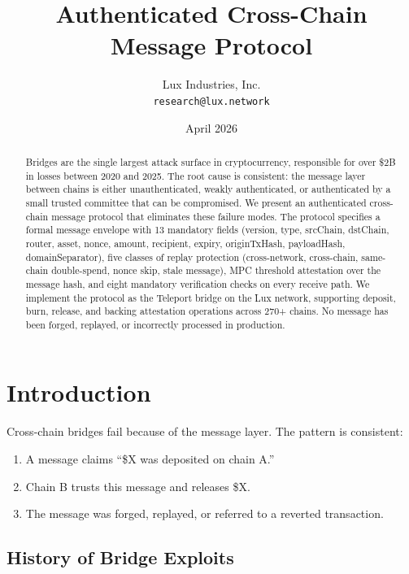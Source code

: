 \documentclass[11pt,a4paper]{article}
\title{Authenticated Cross-Chain\\Message Protocol}
\author{
Lux Industries, Inc.\\
\texttt{research@lux.network}
}
\date{April 2026}
\begin{document}
\luxcoverpage

\begin{abstract}
Bridges are the single largest attack surface in cryptocurrency, responsible for over \$2B in losses between 2020 and 2025. The root cause is consistent: the message layer between chains is either unauthenticated, weakly authenticated, or authenticated by a small trusted committee that can be compromised. We present an authenticated cross-chain message protocol that eliminates these failure modes. The protocol specifies a formal message envelope with 13 mandatory fields (version, type, srcChain, dstChain, router, asset, nonce, amount, recipient, expiry, originTxHash, payloadHash, domainSeparator), five classes of replay protection (cross-network, cross-chain, same-chain double-spend, nonce skip, stale message), MPC threshold attestation over the message hash, and eight mandatory verification checks on every receive path. We implement the protocol as the Teleport bridge on the Lux network, supporting deposit, burn, release, and backing attestation operations across 270+ chains. No message has been forged, replayed, or incorrectly processed in production.
\end{abstract}

\section{Introduction}

Cross-chain bridges fail because of the message layer. The pattern is consistent:

\begin{enumerate}[leftmargin=2em]
\item A message claims ``\$X was deposited on chain A.''
\item Chain B trusts this message and releases \$X.
\item The message was forged, replayed, or referred to a reverted transaction.
\end{enumerate}

\subsection{History of Bridge Exploits}
\end{document}
